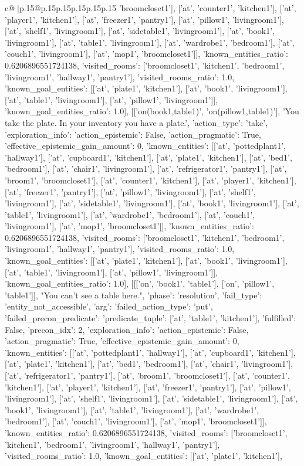 \documentclass{article}
\begin{document}
{\begin{supertabular}{c@{$\;$}|p{.15\linewidth}@{}p{.15\linewidth}p{.15\linewidth}p{.15\linewidth}p{.15\linewidth}p{.15\linewidth}}
{{{'broomcloset1'], ['at', 'counter1', 'kitchen1'], ['at', 'player1', 'kitchen1'], ['at', 'freezer1', 'pantry1'], ['at', 'pillow1', 'livingroom1'], ['at', 'shelf1', 'livingroom1'], ['at', 'sidetable1', 'livingroom1'], ['at', 'book1', 'livingroom1'], ['at', 'table1', 'livingroom1'], ['at', 'wardrobe1', 'bedroom1'], ['at', 'couch1', 'livingroom1'], ['at', 'mop1', 'broomcloset1']], 'known_entities_ratio': 0.6206896551724138, 'visited_rooms': ['broomcloset1', 'kitchen1', 'bedroom1', 'livingroom1', 'hallway1', 'pantry1'], 'visited_rooms_ratio': 1.0, 'known_goal_entities': [['at', 'plate1', 'kitchen1'], ['at', 'book1', 'livingroom1'], ['at', 'table1', 'livingroom1'], ['at', 'pillow1', 'livingroom1']], 'known_goal_entities_ratio': 1.0}}], [['on(book1,table1)', 'on(pillow1,table1)'], 'You take the plate. In your inventory you have a plate.', {'action_type': 'take', 'exploration_info': {'action_epistemic': False, 'action_pragmatic': True, 'effective_epistemic_gain_amount': 0, 'known_entities': [['at', 'pottedplant1', 'hallway1'], ['at', 'cupboard1', 'kitchen1'], ['at', 'plate1', 'kitchen1'], ['at', 'bed1', 'bedroom1'], ['at', 'chair1', 'livingroom1'], ['at', 'refrigerator1', 'pantry1'], ['at', 'broom1', 'broomcloset1'], ['at', 'counter1', 'kitchen1'], ['at', 'player1', 'kitchen1'], ['at', 'freezer1', 'pantry1'], ['at', 'pillow1', 'livingroom1'], ['at', 'shelf1', 'livingroom1'], ['at', 'sidetable1', 'livingroom1'], ['at', 'book1', 'livingroom1'], ['at', 'table1', 'livingroom1'], ['at', 'wardrobe1', 'bedroom1'], ['at', 'couch1', 'livingroom1'], ['at', 'mop1', 'broomcloset1']], 'known_entities_ratio': 0.6206896551724138, 'visited_rooms': ['broomcloset1', 'kitchen1', 'bedroom1', 'livingroom1', 'hallway1', 'pantry1'], 'visited_rooms_ratio': 1.0, 'known_goal_entities': [['at', 'plate1', 'kitchen1'], ['at', 'book1', 'livingroom1'], ['at', 'table1', 'livingroom1'], ['at', 'pillow1', 'livingroom1']], 'known_goal_entities_ratio': 1.0}}], [[['on', 'book1', 'table1'], ['on', 'pillow1', 'table1']], "You can't see a table here.", {'phase': 'resolution', 'fail_type': 'entity_not_accessible', 'arg': {'failed_action_type': 'put', 'failed_precon_predicate': {'predicate_tuple': ['at', 'table1', 'kitchen1'], 'fulfilled': False, 'precon_idx': 2}}, 'exploration_info': {'action_epistemic': False, 'action_pragmatic': True, 'effective_epistemic_gain_amount': 0, 'known_entities': [['at', 'pottedplant1', 'hallway1'], ['at', 'cupboard1', 'kitchen1'], ['at', 'plate1', 'kitchen1'], ['at', 'bed1', 'bedroom1'], ['at', 'chair1', 'livingroom1'], ['at', 'refrigerator1', 'pantry1'], ['at', 'broom1', 'broomcloset1'], ['at', 'counter1', 'kitchen1'], ['at', 'player1', 'kitchen1'], ['at', 'freezer1', 'pantry1'], ['at', 'pillow1', 'livingroom1'], ['at', 'shelf1', 'livingroom1'], ['at', 'sidetable1', 'livingroom1'], ['at', 'book1', 'livingroom1'], ['at', 'table1', 'livingroom1'], ['at', 'wardrobe1', 'bedroom1'], ['at', 'couch1', 'livingroom1'], ['at', 'mop1', 'broomcloset1']], 'known_entities_ratio': 0.6206896551724138, 'visited_rooms': ['broomcloset1', 'kitchen1', 'bedroom1', 'livingroom1', 'hallway1', 'pantry1'], 'visited_rooms_ratio': 1.0, 'known_goal_entities': [['at', 'plate1', 'kitchen1'], }}}
\end{supertabular}}
\end{document}
